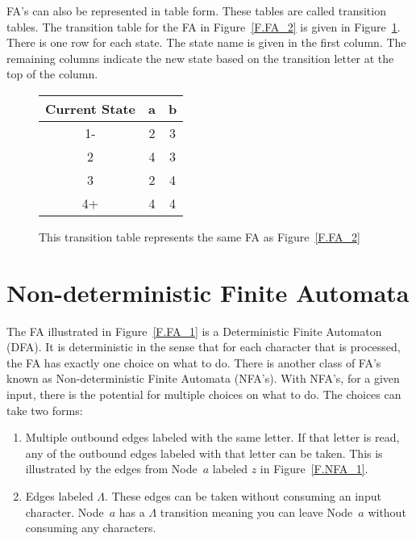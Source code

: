 \documentclass[letterpaper,12pt,openany,reqno]{book}%
\begin{document}
FA's can also be represented in table form. These tables are called transition tables. The transition table for the FA in Figure~\ref{F.FA_2} is given in Figure~\ref{T.FA.2}. There is one row for each state. The state name is given in the first column. The remaining columns indicate the new state based on the transition letter at the top of the column.

\begin{figure}[hbt]
\centering
\begin{tabular}{|c|c|c|}
\hline
Current State & a & b \\
\hline
1- & 2 & 3 \\
\hline
2 & 4 & 3 \\
\hline
3 & 2 & 4 \\
\hline
4+ & 4 & 4 \\
\hline
\end{tabular}
\caption[Transition Table]{This transition table represents the same FA as Figure~\ref{F.FA_2}}
\label{T.FA.2}
\end{figure}

\section{Non-deterministic Finite Automata}

The FA illustrated in Figure~\ref{F.FA_1} is a Deterministic Finite Automaton (DFA). It is deterministic in the sense that for each character that is processed, the FA has exactly one choice on what to do. There is another class of FA's known as Non-deterministic Finite Automata (NFA's). With NFA's, for a given input, there is the potential for multiple choices on what to do. The choices can take two forms:
\begin{enumerate}
\item Multiple outbound edges labeled with the same letter. If that letter is read, any of the outbound edges labeled with that letter can be taken. This is illustrated by the edges from Node~$a$ labeled $z$ in Figure~\ref{F.NFA_1}.
\item Edges labeled $\Lambda$. These edges can be taken without consuming an input character. Node~$a$ has a $\Lambda$ transition meaning you can leave Node~$a$ without consuming any characters.
\end{enumerate}
\end{document}

